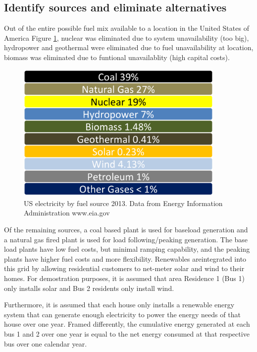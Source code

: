 \documentclass[a4paper]{article}
\begin{document}
\subsection{Identify sources and eliminate alternatives}
  Out of the entire possible fuel mix available to a location in the United States of America Figure \ref{fig:Sources}, nuclear was eliminated due to system unavailability (too big), hydropower and geothermal were eliminated due to fuel unavailability at location, biomass was eliminated due to funtional unavailablity (high capital costs). 
  
  
\begin{figure}[h]
\centering
\includegraphics[width=0.9\textwidth]{Sources.png}
\caption{\label{fig:Sources} US electricity by fuel source 2013. Data from Energy Information Administration www.eia.gov}
\end{figure}
  
Of the remaining sources, a coal based plant is used for baseload generation and a natural gas fired plant is used for load following/peaking generation. The base load plants have low fuel costs, but minimal ramping capability, and the peaking plants have higher fuel costs and more flexibility. Renewables areintegrated into this grid by allowing residential customers to net-meter solar and wind to their homes. For demostration purposes, it is assumed that area Residence 1 (Bus 1) only installs solar and Bus 2 residents only install wind.  

Furthermore, it is assumed that each house only installs a renewable energy system that can generate enough electricity to power the energy needs of that house over one year. Framed differently, the cumulative energy generated at each bus 1 and 2 over one year is equal to the net energy consumed at that respective bus over one calendar year. 
\end{document}

